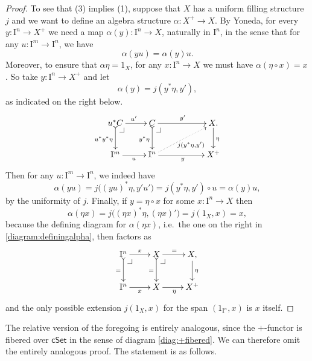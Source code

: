 \documentclass[12pt]{article}
\makeatletter
\newcommand{\cSet}{\ensuremath{\mathsf{cSet}}}
\newcommand{\pbcorner}[1][dr]{\save*!/#1-1.2pc/#1:(-1,1)@^{|-}\restore}
\newcommand{\ra}{\ensuremath{\rightarrow}}
\newcommand{\I}{\ensuremath{\mathrm{I}}}
\theoremstyle{remark}
\theoremstyle{definition}
\makeatother
\begin{document}
\begin{proof}
To see that (3) implies (1), suppose that $X$ has a uniform filling structure $j$ and we want to define an algebra structure $\alpha : X^+ \ra X$. By Yoneda, for every $y : \I^n \ra X^+$ we need a map $\alpha(y) : \I^n \ra X$, naturally in $\I^n$, in the sense that for any $u : \I^m \ra \I^n$, we have
\begin{equation}\label{eq:proof,plusstructure}
\alpha(yu) = \alpha(y)u.
\end{equation}
Moreover, to ensure that $\alpha\eta = 1_X$, for any $x : \I^n \ra X$ we must have $\alpha(\eta\circ x) = x$. So take $y : \I^n \ra X^+$  and let $$\alpha(y) = j(y^*\eta, y'),$$
as indicated on the right below.
\begin{equation}\label{diagram:definingalpha}
\xymatrix{
u^*C \ar@{>->}[d]_{u^*y^*\eta} \ar[r]^{u'} \pbcorner &  C \ar@{>->}[d]_{y^*\eta} \ar[rr]^{y'}\pbcorner && X \ar[d]^\eta . \\
\I^{m} \ar[r]_{u} & \I^{n} \ar@{.>}[rru]_{j(y^*\eta,y')} \ar[rr]_{y} && X^+
}
\end{equation}
Then for any $u : \I^m \ra \I^n$, we indeed have 
$$\alpha(yu) =  j\big( (yu)^*\eta, y'u' \big) = j(y^*\eta, y')\circ u = \alpha(y)u,$$
 by the uniformity of $j$. Finally, if $y=\eta\circ x$ for some $x : \I^n\ra X$ then 
 $$\alpha(\eta x) =  j\big( (\eta x)^*\eta, (\eta x)'\big) = j(1_X, x) = x,$$
 because the defining diagram for $\alpha(\eta x)$, i.e.\ the one on the right in \eqref{diagram:definingalpha}, then factors as
 \begin{equation}\label{diagram:definingalphatwo}
\xymatrix{
\I^n \ar@{>->}[d]_{=} \ar[r]^{x} \pbcorner &  X \ar@{>->}[d]_{=} \ar[r]^{=}\pbcorner & X \ar[d]^\eta , \\
\I^{n} \ar[r]_{x} & X  \ar[r]_{\eta} & X^+
}
\end{equation}
and the only possible extension $j(1_X, x)$ for the span $(1_{\I^n}, x)$ is  $x$ itself.
 \end{proof}
 
The relative version of the foregoing is entirely analogous, since the $+$-functor is fibered over $\cSet$ in the sense of diagram \eqref{diag:+fibered}.  We can therefore omit the entirely analogous proof.  The statement is as follows.
 
\end{document}
